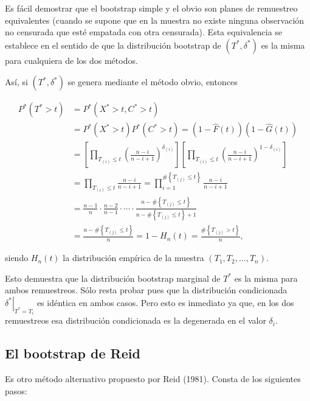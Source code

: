 \documentclass[
]{book}
\theoremstyle{definition}
\theoremstyle{definition}
\theoremstyle{definition}
\theoremstyle{remark}
\begin{document}
Es fácil demostrar que el bootstrap simple y el obvio son planes de
remuestreo equivalentes (cuando se supone que en la muestra no existe
ninguna observación no censurada que esté empatada con otra censurada).
Esta equivalencia se establece en el sentido de que la distribución
bootstrap de \(\left( T^{\ast},\delta^{\ast} \right)\) es la misma para
cualquiera de los dos métodos.

Así, si \(\left( T^{\ast},\delta^{\ast} \right)\) se genera mediante el
método obvio, entonces

\[\begin{aligned}
P^{\ast}\left( T^{\ast}>t \right) &= P^{\ast}\left( X^{\ast}>t,C^{\ast
}>t \right) \\
&= P^{\ast}\left( X^{\ast}>t \right) P^{\ast}\left( C^{\ast}>t \right)
=\left( 1-\hat{F}\left( t \right) \right) \left( 1-\hat{G}\left( t \right)
 \right) \\
&= \left[ \prod_{T_{(i)}\leq t}\left( \frac{n-i}{n-i+1} \right)
^{\delta _{(i)}}\right] \left[ \prod_{T_{(i)}\leq
t}\left( \frac{n-i}{n-i+1} \right)^{1-\delta _{(i)}}\right] \\
&= \prod_{T_{(i)}\leq t}\frac{n-i}{n-i+1}=\prod_{i=1}^{\#\left
\{ T_{(j)}\leq t\right\} }\frac{n-i}{n-i+1} \\
&= \frac{n-1}{n}\cdot \frac{n-2}{n-1}\cdot \cdots \cdot \frac{n-\#\left\{
T_{(j)}\leq t\right\} }{n-\#\left\{ T_{(j)}\leq
t\right\} +1} \\
&= \frac{n-\#\left\{ T_{(j)}\leq t\right\} }{n}=1-H_n\left(
t \right) =\frac{\#\left\{ T_{(j)}>t\right\} }{n},
\end{aligned}\]

siendo \(H_n\left( t \right)\) la distribución empírica de la muestra
\(\left( T_1,T_2,\ldots ,T_n \right)\).

Esto demuestra que la distribución bootstrap marginal de \(T^{\ast}\) es
la misma para ambos remuestreos. Sólo resta probar pues que la
distribución condicionada
\(\left. \delta^{\ast}\right\vert _{T^{\ast}=T_i}\) es idéntica en
ambos casos. Pero esto es inmediato ya que, en los dos remuestreos esa
distribución condicionada es la degenerada en el valor
\(\delta _i\).

\hypertarget{cap8-reid}{%
\subsection{El bootstrap de Reid}\label{cap8-reid}}

Es otro método alternativo propuesto por Reid (1981). Consta de los
siguientes pasos:
\end{document}
